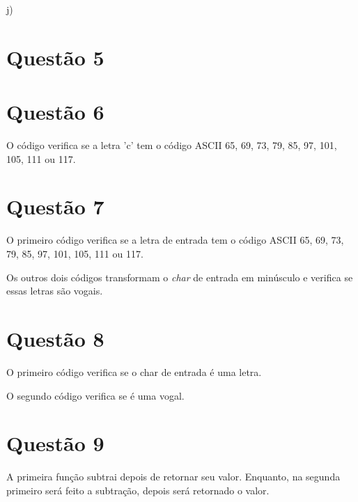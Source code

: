 \documentclass{article}
\begin{document}
    j)
\newline

\section{Questão 5}




\section{Questão 6}
\hspace{10mm} O código verifica se a letra 'c' tem o código ASCII  65, 69, 73, 79, 85, 97, 101, 105, 111 ou 117.

\section{Questão 7}
\hspace{4mm} O primeiro código verifica se a letra de entrada tem o código ASCII  65, 69, 73, 79, 85, 97, 101, 105, 111 ou 117.

Os outros dois códigos transformam o \emph{char} de entrada em minúsculo e verifica se essas letras são vogais.
    
\section{Questão 8}
\hspace{4mm} O primeiro código verifica se o char de entrada é uma letra.

O segundo código verifica se é uma vogal.

\section{Questão 9}


A primeira função subtrai depois de retornar seu valor. Enquanto, na segunda primeiro será feito a subtração, depois será retornado o valor.
\end{document}
